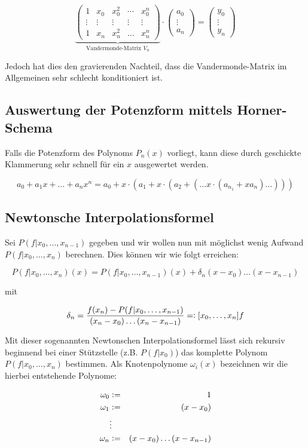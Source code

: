 \documentclass[a4paper,parskip=half*,DIV=7,fontsize=11pt]{scrartcl}
\newcommand{\defeq}{\vcentcolon =}
\newcommand{\eqdef}{=\vcentcolon}
\begin{document}
\[\underbrace{\begin{pmatrix} 1 & x_0 & x_0^2 & \cdots & x_0^n \\ \vdots & \vdots & \vdots & \vdots & \vdots \\ 1 & x_n & x_n^2 & \ldots & x_n^n\end{pmatrix}}_{\text{Vandermonde-Matrix $V_n$}} \cdot \begin{pmatrix} a_0 \\ \vdots \\ a_n \end{pmatrix} = \begin{pmatrix} y_0 \\ \vdots \\ y_n \end{pmatrix}\]

Jedoch hat dies den gravierenden Nachteil, dass die Vandermonde-Matrix im Allgemeinen sehr schlecht konditioniert ist. 

\subsection{Auswertung der Potenzform mittels Horner-Schema}
Falls die Potenzform des Polynoms $P_n (x)$ vorliegt, kann diese durch geschickte Klammerung sehr schnell für ein $x$ ausgewertet werden.

\[a_0 + a_1x + \hdots + a_nx^n = a_0 + x\cdot (a_1 + x\cdot (a_2 + (\hdots  x\cdot (a_{n_1} + xa_n) \hdots) ) )\]

\subsection{Newtonsche Interpolationsformel}
Sei $P(f|x_0,\ldots,x_{n-1})$ gegeben und wir wollen nun mit möglichst wenig Aufwand $P(f|x_0,\ldots,x_n)$ berechnen. Dies können wir wie folgt erreichen:

\[P(f|x_0,\ldots,x_n)(x) = P(f|x_0,\ldots,x_{n-1}) (x) + \delta_n(x-x_0)\ldots (x-x_{n-1})\]

mit

\[\delta_n = \frac{f(x_n) - P(f|x_0,\ldots,x_{n-1})}{(x_n -x_0)\ldots (x_n-x_{n-1})} \eqdef [x_0,\ldots,x_n]f\]

Mit dieser sogenannten Newtonschen Interpolationsformel lässt sich rekursiv beginnend bei einer Stützstelle (z.B. $P(f|x_0)$) das komplette Polynom $P(f|x_0,\ldots,x_n)$ bestimmen. Als Knotenpolynome $\omega_i (x)$ bezeichnen wir die hierbei entstehende Polynome:

\begin{eqnarray}
\omega_0 &\defeq& 1 \nonumber \\
\omega_1 &\defeq& (x-x_0) \nonumber \\
&\vdots& \nonumber \\
\omega_n &\defeq& (x-x_0)\ldots (x-x_{n-1}) \nonumber
\end{eqnarray}
\end{document}
